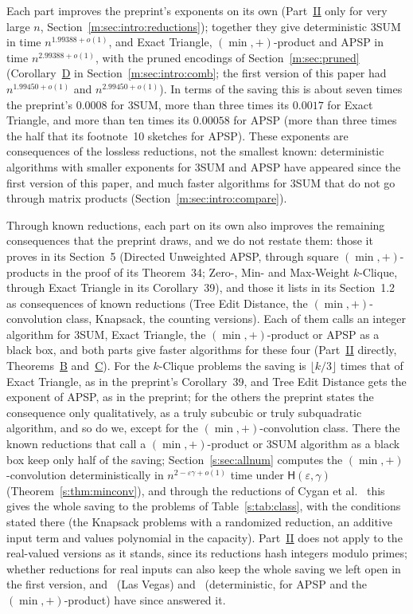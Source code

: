 \documentclass[11pt]{article}
\theoremstyle{definition}
\theoremstyle{remark}
\newcommand{\Hyp}{\mathsf{H}}
\newcommand{\ExpThreeSumVone}{1.99450}%
\newcommand{\ExpThreeSumBest}{1.99388}%
\newcommand{\ExpAPSPBest}{2.99388}%
\newcommand{\ExpAPSPVone}{2.99450}%
\begin{document}
Each part improves the preprint's exponents on its own (Part~\hyperref[m:partII]{II} only for very large $n$, Section~\ref{m:sec:intro:reductions}); %
together they give deterministic 3SUM in time $n^{\ExpThreeSumBest+o(1)}$, and Exact Triangle, $(\min,+)$-product and APSP in time $n^{\ExpAPSPBest+o(1)}$, with the pruned encodings of Section~\ref{m:sec:pruned} (Corollary~\hyperref[m:introD]{D} in Section~\ref{m:sec:intro:comb}; the first version of this paper had $n^{\ExpThreeSumVone+o(1)}$ and $n^{\ExpAPSPVone+o(1)}$).
In terms of the saving this is about seven times the preprint's $0.0008$ for 3SUM, more than three times its $0.0017$ for Exact Triangle, and more than ten times its $0.00058$ for APSP (more than three times the half that its footnote~10 sketches for APSP). These exponents are consequences of the lossless reductions, not the smallest known: deterministic algorithms with smaller exponents for 3SUM and APSP have appeared since the first version of this paper, and much faster algorithms for 3SUM that do not go through matrix products (Section~\ref{m:sec:intro:compare}).

Through known reductions, each part on its own also improves the remaining consequences that the preprint draws, and we do not restate them: those it proves in its Section~5 (Directed Unweighted APSP, through square $(\min,+)$-products in the proof of its Theorem~34; Zero-, Min- and Max-Weight $k$-Clique, through Exact Triangle in its Corollary~39), and those it lists in its Section~1.2 as consequences of known reductions (Tree Edit Distance, the $(\min,+)$-convolution class, Knapsack, the counting versions). Each of them calls an integer algorithm for 3SUM, Exact Triangle, the $(\min,+)$-product or APSP as a black box, and both parts give faster algorithms for these four (Part~\hyperref[m:partII]{II} directly, Theorems~\hyperref[m:introB]{B} and~\hyperref[m:introC]{C}). For the $k$-Clique problems the saving is $\lfloor k/3\rfloor$ times that of Exact Triangle, as in the preprint's Corollary~39, and Tree Edit Distance gets the exponent of APSP, as in the preprint; for the others the preprint states the consequence only qualitatively, as a truly subcubic or truly subquadratic algorithm, and so do we, except for the $(\min,+)$-convolution class.
There the known reductions that call a $(\min,+)$-product or 3SUM algorithm as a black box keep only half of the saving; Section~\ref{s:sec:allnum} computes the $(\min,+)$-convolution deterministically in $n^{2-\varepsilon\gamma+o(1)}$ time under $\Hyp(\varepsilon,\gamma)$ (Theorem~\ref{s:thm:minconv}), and through the reductions of Cygan et al.~\cite{CMWW19} this gives the whole saving to the problems of Table~\ref{s:tab:class}, with the conditions stated there (the Knapsack problems with a randomized reduction, an additive input term and values polynomial in the capacity). Part~\hyperref[m:partII]{II} does not apply to the real-valued versions as it stands, since its reductions hash integers modulo primes; whether reductions for real inputs can also keep the whole saving we left open in the first version, and~\cite[Lemma~29]{Shr26} (Las Vegas) and~\cite{EZ26} (deterministic, for APSP and the $(\min,+)$-product) have since answered it.
\end{document}
